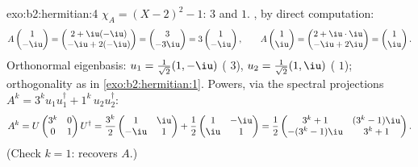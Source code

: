 \begin{solution}{exo:b2:hermitian:4}
$\chi_A = (X-2)^2 - 1$:  $3$ and $1$. , by
direct computation:
\[
A\begin{pmatrix}1\\ -\iu\end{pmatrix}
= \begin{pmatrix} 2 + \iu(-\iu)\\ -\iu + 2(-\iu)\end{pmatrix}
= \begin{pmatrix} 3\\ -3\iu \end{pmatrix}
= 3\begin{pmatrix}1\\ -\iu\end{pmatrix},
\qquad
A\begin{pmatrix}1\\ \iu\end{pmatrix}
= \begin{pmatrix} 2 + \iu\cdot\iu\\ -\iu + 2\iu\end{pmatrix}
= \begin{pmatrix}1\\ \iu\end{pmatrix}.
\]
Orthonormal eigenbasis: $u_1 = \frac{1}{\sqrt2}(1, -\iu)$
( $3$), $u_2 = \frac{1}{\sqrt2}(1, \iu)$ (
$1$); orthogonality as in \cref{exo:b2:hermitian:1}. Powers, via
the spectral projections $A^k = 3^k u_1u_1^\dagger + 1^k\,
u_2u_2^\dagger$:
\[
A^k = U\begin{pmatrix} 3^k & 0\\ 0 & 1\end{pmatrix}U^\dagger
= \frac{3^k}{2}\begin{pmatrix} 1 & \iu\\ -\iu & 1\end{pmatrix}
+ \frac{1}{2}\begin{pmatrix} 1 & -\iu\\ \iu & 1\end{pmatrix}
= \frac12\begin{pmatrix}
3^k + 1 & (3^k - 1)\iu\\
-(3^k-1)\iu & 3^k + 1
\end{pmatrix}.
\]
(Check $k = 1$: recovers $A$.)
\end{solution}

